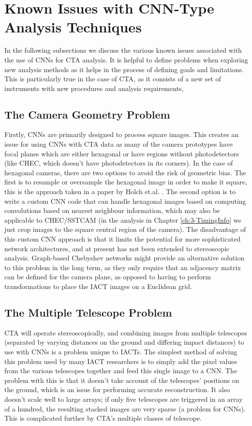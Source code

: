 \section{Known Issues with CNN-Type Analysis Techniques}
In the following subsections we discuss the various known issues associated with the use of CNNs for CTA analysis. It is helpful to define problems when exploring new analysis methods as it helps in the process of defining goals and limitations. This is particularly true in the case of CTA, as it consists of a new set of instruments with new procedures and analysis requirements,
\subsection{The Camera Geometry Problem}

Firstly, CNNs are primarily designed to process square images. This creates an issue for using CNNs with CTA data as many of the camera prototypes have focal planes which are either hexagonal or have regions without photodetectors (like CHEC, which doesn't have photodetectors in its corners). In the case of hexagonal cameras, there are two options to avoid the risk of geometric bias. The first is to resample or oversample the hexagonal image in order to make it square, this is the approach taken in a paper by Holch et.al. \cite{Hexagdly}. The second option is to write a custom CNN code that can handle hexagonal images based on computing convolutions based on nearest neighbour information, which may also be applicable to CHEC/SSTCAM (in the analysis in Chapter \ref{ch:3-TimingInfo} we just crop images to the square central region of the camera). The disadvantage of this custom CNN approach is that it limits the potential for more sophisticated network architectures, and at present has not been extended to stereoscopic analysis. Graph-based Chebyshev networks \cite{adithesis} might provide an alternative solution to this problem in the long term, as they only require that an adjacency matrix can be defined for the camera plane, as opposed to having to perform transformations to place the IACT images on a Euclidean grid. 

\subsection{The Multiple Telescope Problem}

CTA will operate stereoscopically, and combining images from multiple telescopes (separated by varying distances on the ground and differing impact distances) to use with CNNs is a problem unique to IACTs. The simplest method of solving this problem used by many IACT researchers is to simply add the pixel values from the various telescopes together and feed this single image to a CNN. The problem with this is that it doesn't take account of the telescopes' positions on the ground, which is an issue for performing accurate reconstruction. It also doesn't scale well to large arrays; if only five telescopes are triggered in an array of a hundred, the resulting stacked images are very sparse (a problem for CNNs). This is complicated further by CTA's multiple classes of telescope.

